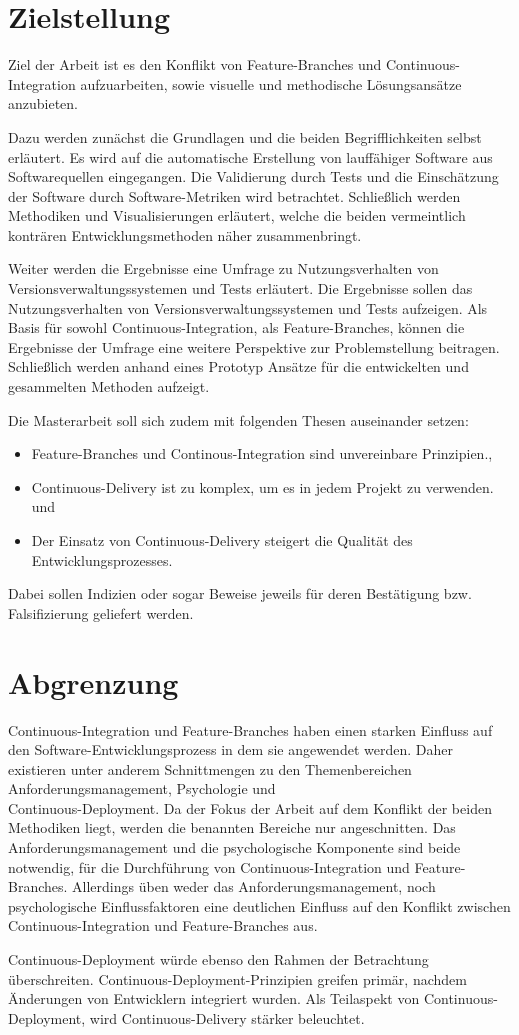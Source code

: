 \section{Zielstellung}

Ziel der Arbeit ist es den Konflikt von \glqq Feature-Branches\grqq{} und \glqq Continuous-Integration\grqq{} aufzuarbeiten, sowie visuelle und methodische Lösungsansätze anzubieten. 

Dazu werden zunächst die Grundlagen und die beiden Begrifflichkeiten selbst erläutert. Es wird auf die automatische Erstellung von lauffähiger Software aus Softwarequellen eingegangen. Die Validierung durch Tests und die Einschätzung der Software durch Software-Metriken wird betrachtet. Schließlich werden Methodiken und Visualisierungen erläutert, welche die beiden vermeintlich konträren Entwicklungsmethoden näher zusammenbringt.

Weiter werden die Ergebnisse eine Umfrage zu \glqq Nutzungsverhalten von Versionsverwaltungssystemen und Tests\grqq{} erläutert. Die Ergebnisse sollen das Nutzungsverhalten von Versionsverwaltungssystemen und Tests aufzeigen. Als Basis für sowohl Continuous-Integration, als Feature-Branches, können die Ergebnisse der Umfrage eine weitere Perspektive zur Problemstellung beitragen. Schließlich werden anhand eines Prototyp Ansätze für die entwickelten und gesammelten Methoden aufzeigt.

Die Masterarbeit soll sich zudem mit folgenden Thesen auseinander setzen:
\begin{itemize}
\item \glqq Feature-Branches und Continous-Integration sind unvereinbare Prinzipien.\grqq{},
\item \glqq Continuous-Delivery ist zu komplex, um es in jedem Projekt zu verwenden.\grqq{} und
\item \glqq Der Einsatz von Continuous-Delivery steigert die Qualität des Entwicklungsprozesses.\grqq{}
\end{itemize}
Dabei sollen Indizien oder sogar Beweise jeweils für deren Bestätigung bzw. Falsifizierung geliefert werden.

\section{Abgrenzung}

Continuous-Integration und Feature-Branches haben einen starken Einfluss auf den Software-Entwicklungsprozess in dem sie angewendet werden. Daher existieren unter anderem Schnittmengen zu den Themenbereichen Anforderungsmanagement, Psychologie und \\Continuous-Deployment. 
Da der Fokus der Arbeit auf dem Konflikt der beiden Methodiken liegt, werden die benannten Bereiche nur angeschnitten. Das Anforderungsmanagement und die psychologische Komponente sind beide notwendig, für die Durchführung von Continuous-Integration und Feature-Branches. Allerdings üben weder das Anforderungsmanagement, noch psychologische Einflussfaktoren eine deutlichen Einfluss auf den Konflikt zwischen Continuous-Integration und Feature-Branches aus. 

Continuous-Deployment würde ebenso den Rahmen der Betrachtung überschreiten. Continuous-Deployment-Prinzipien greifen primär, nachdem Änderungen von Entwicklern integriert wurden. Als Teilaspekt von Continuous-Deployment, wird Continuous-Delivery stärker beleuchtet.
